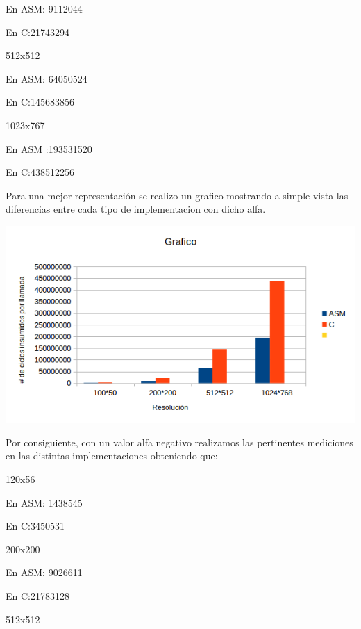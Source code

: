 En ASM: 9112044

En C:21743294

 \vspace*{0.3cm} \noindent
512x512

En ASM: 64050524

En C:145683856

 \vspace*{0.3cm} \noindent
1023x767

En ASM :193531520

En C:438512256


  \vspace*{0.3cm}

 Para una mejor representación se realizo un grafico mostrando a simple vista
 las diferencias entre cada tipo de implementacion con dicho alfa.
 \vspace*{0.3cm} \vspace*{0.3cm}
  \begin{center}
 \includegraphics[scale=1]{ldr+.png}
 \end{center}
  \vspace*{0.3cm} 

  Por consiguiente, con un valor alfa negativo realizamos las pertinentes mediciones en las distintas implementaciones 
  obteniendo que: \vspace*{0.3cm} \noindent
  
  
  120x56
  
En ASM: 1438545

En C:3450531

 \vspace*{0.3cm} \noindent
200x200

En ASM: 9026611

En C:21783128

 \vspace*{0.3cm} \noindent
512x512

